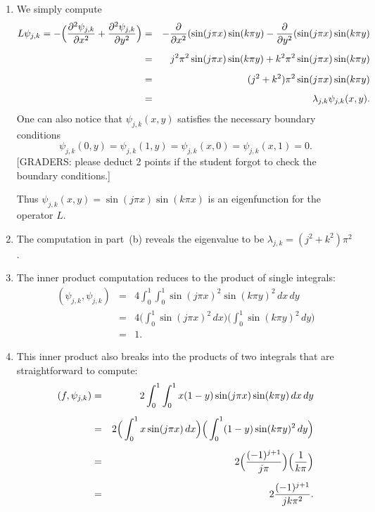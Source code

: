 {\begin{solution}
\begin{enumerate}
\item We simply compute
        \begin{eqnarray*}
          L \psi_{j,k}  = 
                    -\Big({{\partial}^2\psi_{j,k} \over {\partial} x^2}  
                        + {{\partial}^2\psi_{j,k} \over {\partial} y^2}\Big)
           &=& -{{\partial} \over {\partial} x^2} (\sin(j\pi x)\sin(k\pi y)
             -{{\partial} \over {\partial} y^2} (\sin(j\pi x)\sin(k\pi y) \\[0.5em]
           &=& j^2\pi^2 \sin(j\pi x)\sin(k\pi y)
             + k^2 \pi^2 \sin(j\pi x)\sin(k\pi y) \\[0.5em]
           &=& (j^2 + k^2)\pi^2 \sin(j\pi x)\sin(k\pi y) \\[0.5em]
           &=& \lambda_{j,k} \psi_{j,k}(x,y).
        \end{eqnarray*} 
      One can also notice that $\psi_{j,k}(x,y)$ satisfies the
      necessary boundary conditions 
         \[ \psi_{j,k}(0,y) = \psi_{j,k}(1,y) 
                            = \psi_{j,k}(x,0) = \psi_{j,k}(x,1) = 0.\]
      {[GRADERS: please deduct 2 points if the student forgot 
                to check the boundary conditions.]}

      Thus $\psi_{j,k}(x,y) = \sin(j\pi x)\sin(k\pi x)$ is an 
      eigenfunction for the operator $L$.

\item The computation in part~(b) reveals the eigenvalue to be 
       $\lambda_{j,k}=(j^2+k^2)\pi^2$.

\item The inner product computation reduces to the product of 
      single integrals:
      \begin{eqnarray*}
           (\psi_{j,k}, \psi_{j,k}) 
              &=& 4\int_0^1 \int_0^1 \sin(j\pi x)^2 \sin(k\pi y)^2\, dx\,dy \\[0.5em]
              &=& 4\Big(\int_0^1 \sin(j\pi x)^2\, dx \Big)
                  \Big(\int_0^1 \sin(k\pi y)^2\, dy \Big) \\[0.5em]
              &=& 1.
      \end{eqnarray*}

\item This inner product also breaks into the products of two integrals
         that are straightforward to compute:
      \begin{eqnarray*}
           (f, \psi_{j,k}) 
              &=& 2 \int_0^1 \int_0^1 x(1-y)\sin(j\pi x) \sin(k\pi y)\, dx\,dy \\[0.5em]
              &=& 2 \Big(\int_0^1 x \sin(j\pi x)\, dx \Big)
                  \Big(\int_0^1 (1-y)\sin(k\pi y)^2\, dy \Big) \\[0.5em]
              &=& 2 \Big({(-1)^{j+1}\over j\pi} \Big)
                  \Big({1\over k\pi} \Big) \\[0.5em]
              &=& 2{(-1)^{j+1} \over jk\pi^2}.
      \end{eqnarray*}
    

\end{enumerate}
\end{solution}}
